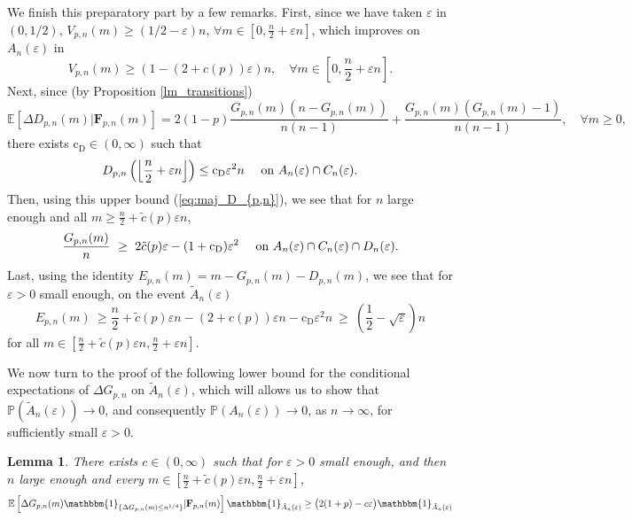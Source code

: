 \documentclass[a4, 11pt]{article}
\numberwithin{equation}{section}
\theoremstyle{plain}
\newtheorem{lemma}[theorem]{Lemma}
\theoremstyle{definition}
\theoremstyle{remark}
\begin{document}
We finish this preparatory part by a few remarks. First, since we have taken $\varepsilon$ in $\left(0,1/2\right)$, $V_{p,n}(m) \geq \left(1/2-\varepsilon\right)n$, $\forall m \in \left[0,\frac{n}{2}+\varepsilon n\right]$, which improves on $A_n(\varepsilon)$ in
\begin{equation}\label{eq:def_H_n}
V_{p,n}(m) \geq \left(1-(2+c(p))\varepsilon\right)n, \quad \forall m \in \left[0,\frac{n}{2}+\varepsilon n\right]. 
\end{equation} 
Next, since (by Proposition \ref{lm_transitions})
$$\mathbb{E}\left[\Delta D_{p,n}(m)\vert \mathbf{F}_{p,n}(m)\right]=2(1-p)\frac{G_{p,n}(m)\left(n-G_{p,n}(m)\right)}{n(n-1)}+\frac{G_{p,n}(m)\left(G_{p,n}(m)-1\right)}{n(n-1)}, \quad \forall m\geq 0,$$  
there exists $\mathrm{c_D} \in (0,\infty)$ such that 
\begin{equation}\label{eq:maj_D_{p,n}}
	D_{p,n}\left(\left\lfloor\frac{n}{2}+\varepsilon n\right\rfloor\right)\leq \mathrm{c_D} \varepsilon^2n \quad \text{ on } A_n(\varepsilon)\cap C_n(\varepsilon). 
\end{equation}
Then, using this upper bound (\ref{eq:maj_D_{p,n}}), we see that for $n$ large enough and all $m \geq \frac{n}{2}+\tilde{c}(p)\varepsilon n$,
\begin{equation}
\label{eq:min_G_{p,n}}
\frac{G_{p,n}(m)}{n}~\geq~2\tilde{c}(p)\varepsilon -(1+\mathrm{c_D})\varepsilon^2 \quad \text{ on } A_n(\varepsilon)\cap C_n(\varepsilon)\cap D_n(\varepsilon).
\end{equation}
Last, using the identity $E_{p,n}(m)=m-G_{p,n}(m)-D_{p,n}(m)$, we see that for $\varepsilon>0$ small enough, on the event $\tilde{A}_n(\varepsilon)$
\begin{equation}
\label{eq:borne_inf_edges}
	E_{p,n}(m)~\geq\frac{n}{2}+\tilde{c}(p)\varepsilon n-(2+c(p))\varepsilon n -\mathrm{c_D}\varepsilon^2 n~\geq~\left(\frac{1}{2}-\sqrt \varepsilon\right)n 
\end{equation}
for all $m\in \left[\frac{n}{2}+\tilde{c}(p)\varepsilon n, \frac{n}{2}+\varepsilon n  \right]$. 

\bigskip

We now turn to the proof of the following lower bound for the conditional expectations of $\Delta G_{p,n}$ on $\tilde{A}_n(\varepsilon)$, which will allows us to show that $\mathbb P(\tilde A_n(\varepsilon))\rightarrow 0$, and consequently $\mathbb P( A_n(\varepsilon))\rightarrow 0$, as $n \rightarrow \infty$, for sufficiently small $\varepsilon>0$.

\begin{lemma}\label{lm:min_esp}
	There exists $c \in (0,\infty)$ such that for $\varepsilon>0$ small enough, and then $n$ large enough and every $m\in\left[\frac{n}{2}+\tilde{c}(p)\varepsilon n,\frac{n}{2}+\varepsilon n\right]$,
	$$	\mathbb{E}\left[\Delta G_{p,n}(m)\mathbbm{1}_{\{\Delta G_{p,n}(m)\leq n^{1/4}\}}\vert \mathbf{F}_{p,n}(m)   \right]\mathbbm{1}_{\tilde{A}_n(\varepsilon)}\geq 
	\big(2(1+p)-{c}\varepsilon \big)\mathbbm{1}_{\tilde{A}_n(\varepsilon)}$$  \end{lemma} 
\end{document}

